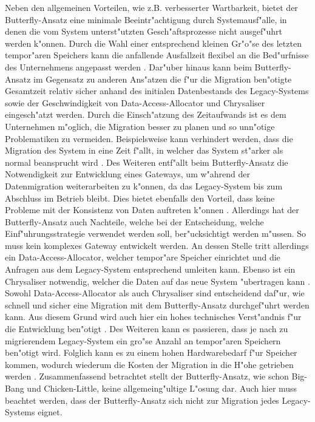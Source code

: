 \lb
Neben den allgemeinen Vorteilen, wie z.B. verbesserter Wartbarkeit, bietet der Butterfly-Ansatz eine minimale Beeintr"achtigung durch Systemausf"alle, in denen die vom System unterst"utzten Gesch"aftsprozesse nicht ausgef"uhrt werden k"onnen. Durch die Wahl einer entsprechend kleinen Gr"o"se des letzten tempor"aren Speichers kann die anfallende Ausfallzeit flexibel an die Bed"urfnisse des Unternehmens angepasst werden \citep[S.~204f.]{wuLawlessBisbal-1997}. Dar"uber hinaus kann beim Butterfly-Ansatz im Gegensatz zu anderen Ans"atzen die f"ur die Migration ben"otigte Gesamtzeit relativ sicher anhand des initialen Datenbestands des Legacy-Systems sowie der Geschwindigkeit von Data-Access-Allocator und Chrysaliser eingesch"atzt werden. Durch die Einsch"atzung des Zeitaufwands ist es dem Unternehmen m"oglich, die Migration besser zu planen und so unn"otige Problematiken zu vermeiden. Beispielsweise kann verhindert werden, dass die Migration des System in eine Zeit f"allt, in welcher das System st"arker als normal beansprucht wird \cite[S.~204]{wuLawlessBisbal-1997}. Des Weiteren entf"allt beim Butterfly-Ansatz die Notwendigkeit zur Entwicklung eines Gateways, um w"ahrend der Datenmigration weiterarbeiten zu k"onnen, da das Legacy-System bis zum Abschluss im Betrieb bleibt. Dies bietet ebenfalls den Vorteil, dass keine Probleme mit der Konsistenz von Daten auftreten k"onnen \citep[S.~3]{wuLawless-1997}.
\lb
Allerdings hat der Butterfly-Ansatz auch Nachteile, welche bei der Entscheidung, welche Einf"uhrungsstrategie verwendet werden soll, ber"ucksichtigt werden m"ussen. So muss kein komplexes Gateway entwickelt werden. An dessen Stelle tritt allerdings ein Data-Access-Allocator, welcher tempor"are Speicher einrichtet und die Anfragen aus dem Legacy-System entsprechend umleiten kann. Ebenso ist ein Chrysaliser notwendig, welcher die Daten auf das neue System "ubertragen kann \citep[S.~3]{wuLawless-1997}. Sowohl Data-Access-Allocator als auch Chrysaliser sind entscheidend daf"ur, wie schnell und sicher eine Migration mit dem Butterfly-Ansatz durchgef"uhrt werden kann. Aus diesem Grund wird auch hier ein hohes technisches Verst"andnis f"ur die Entwicklung ben"otigt \citep[S.~204]{wuLawlessBisbal-1997}. Des Weiteren kann es passieren, dass je nach zu migrierendem Legacy-System ein gro"se Anzahl an tempor"aren Speichern ben"otigt wird. Folglich kann es zu einem hohen Hardwarebedarf f"ur Speicher kommen, wodurch wiederum die Kosten der Migration in die H"ohe getrieben werden \citep[S.~109f.]{bisbal-1999}.
\lb
Zusammenfassend betrachtet stellt der Butterfly-Ansatz, wie schon Big-Bang und Chicken-Little, keine allgemeing"ultige L"osung dar. Auch hier muss beachtet werden, dass der Butterfly-Ansatz sich nicht zur Migration jedes Legacy-Systems eignet. 
